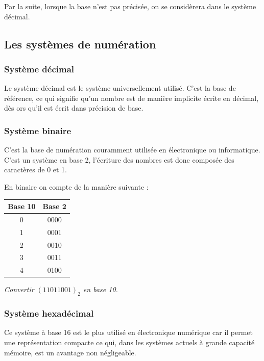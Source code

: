 \documentclass[10pt,fleqn]{article} %
\begin{document}
\begin{rem}
Par la suite, lorsque la base n'est pas précisée, on se considèrera dans le système décimal. 


\end{rem}

\subsection{Les systèmes de numération}
\subsubsection{Système décimal}
Le système décimal est le système universellement utilisé. C'est la base de référence, ce qui signifie qu'un nombre est de manière implicite écrite en décimal, dès ors qu'il est écrit dans précision de base. 

\subsubsection{Système binaire}

C'est la base de numération couramment utilisée en électronique ou informatique. C'est un système en base 2, l'écriture des nombres est donc composée des caractères de 0 et 1. 

\begin{exemple}

\begin{minipage}[c]{.4\linewidth}
En binaire on compte de la manière suivante : 
\begin{center}
\begin{tabular}{|c|c|}
\hline
Base 10 & Base 2 \\
\hline \hline
0 & 0000 \\ \hline
1 & 0001 \\ \hline
2 & 0010 \\ \hline
3 & 0011 \\ \hline
4 & 0100 \\ \hline
\end{tabular}
\end{center}
\end{minipage}%
\textit{Convertir $\left(11011001\right)_2$ en base 10.}
\end{exemple}

\subsubsection{Système hexadécimal}
Ce système à base 16 est le plus utilisé en électronique numérique car il permet une représentation compacte ce qui, dans les systèmes actuels à grande capacité mémoire, est un avantage non négligeable.
\end{document}
